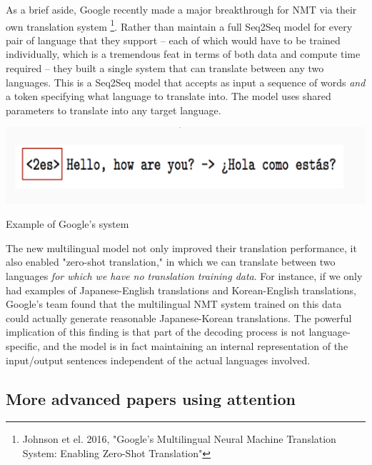 \documentclass{tufte-handout}
\begin{document}
As a brief aside, Google recently made a major breakthrough for NMT via their own translation system \footnote{Johnson et el. 2016, "Google's Multilingual Neural Machine Translation System: Enabling Zero-Shot Translation"}. Rather than maintain a full Seq2Seq model for every pair of language that they support -- each of which would have to be trained individually, which is a tremendous feat in terms of both data and compute time required -- they built a single system that can translate between any two languages. This is a Seq2Seq model that accepts as input a sequence of words \textit{and} a token specifying what language to translate into. The model uses shared parameters to translate into any target language.

\begin{marginfigure}
	\centering
	\includegraphics[width=\linewidth]{google_example.png}
	\caption {Example of Google's system}
	\label{fig:bidir_enc}
\end{marginfigure}

The new multilingual model not only improved their translation performance, it also enabled "zero-shot translation," in which we can translate between two languages \textit{for which we have no translation training data}. For instance, if we only had examples of Japanese-English translations and Korean-English translations, Google's team found that the multilingual NMT system trained on this data could actually generate reasonable Japanese-Korean translations. The powerful implication of this finding is that part of the decoding process is not language-specific, and the model is in fact maintaining an internal representation of the input/output sentences independent of the actual languages involved.

\subsection{More advanced papers using attention}

\end{document}
